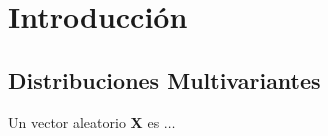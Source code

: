 \chapter*{Introducción}

\section{Distribuciones Multivariantes}
\begin{defi}
Un vector aleatorio \textbf{X} es $\ldots$ %
\end{defi}